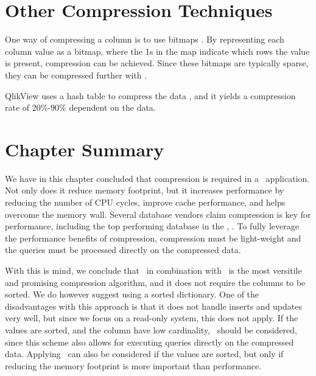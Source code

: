 
\section{Other Compression Techniques}
\label{sec:Other Compression Techniques}
One way of compressing a column is to use bitmaps \cite{Stonebraker2005-qz}. By representing each column value as a bitmap, where the 1s in the map indicate which rows the value is present, compression can be achieved. Since these bitmaps are typically sparse, they can be compressed further with \rle.

QlikView uses a hash table to compress the data \cite{Qlik2014-vd}, and it yields a compression rate of 20\%-90\% dependent on the data.

\section{Chapter Summary}
\label{sec:Chapter Summary}
We have in this chapter concluded that compression is required in a \bd~application. Not only does it reduce memory footprint, but it increases performance by reducing the number of CPU cycles, improve cache performance, and helps overcome the memory wall. Several database vendors claim compression is key for performance, including the top performing database in the \tpch, \exasol. To fully leverage the performance benefits of compression, compression must be light-weight and the queries must be processed directly on the compressed data.

With this is mind, we conclude that \de~in combination with \bp~is the most versitile and promising compression algorithm, and it does not require the columns to be sorted. We do however suggest using a sorted dictionary. One of the disadvantages with this approach is that it does not handle inserts and updates very well, but since we focus on a read-only system, this does not apply. If the values are sorted, and the column have low cardinality, \rle~should be considered, since this scheme also allows for executing queries directly on the compressed data. Applying \dele~can also be considered if the values are sorted, but only if reducing the memory footprint is more important than performance.




